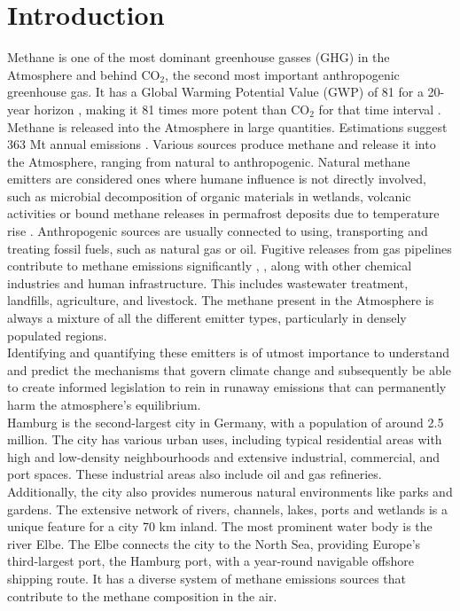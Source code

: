\chapter{Introduction}
\label{chap:intro}

Methane is one of the most dominant greenhouse gasses (GHG) in the Atmosphere and behind CO$_2$, the second most important anthropogenic greenhouse gas. It has a Global Warming Potential Value (GWP) of 81 for a 20-year horizon \cite{Forster.2021}, making it 81 times more potent than CO$_2$ for that time interval \cite{T.Stocker.2013}.\\
Methane is released into the Atmosphere in large quantities. Estimations suggest 363 Mt annual emissions \cite{IEA.4262023}. Various sources produce methane and release it into the Atmosphere, ranging from natural to anthropogenic. Natural methane emitters are considered ones where humane influence is not directly involved, such as microbial decomposition of organic materials in wetlands, volcanic activities or bound methane releases in permafrost deposits due to temperature rise \cite{Fernandez.2022}.  Anthropogenic sources are usually connected to using, transporting and treating fossil fuels, such as natural gas or oil. Fugitive releases from gas pipelines contribute to methane emissions significantly \cite{Schwietzke.2014}, \cite{McKain.2015}, along with other chemical industries and human infrastructure. This includes wastewater treatment, landfills, agriculture, and livestock. The methane present in the Atmosphere is always a mixture of all the different emitter types, particularly in densely populated regions.\\
Identifying and quantifying these emitters is of utmost importance to understand and predict the mechanisms that govern climate change and subsequently be able to create informed legislation to rein in runaway emissions that can permanently harm the atmosphere's equilibrium. \\
Hamburg is the second-largest city in Germany, with a population of around 2.5 million. The city has various urban uses, including typical residential areas with high and low-density neighbourhoods and extensive industrial, commercial, and port spaces. These industrial areas also include oil and gas refineries. Additionally, the city also provides numerous natural environments like parks and gardens. The extensive network of rivers, channels, lakes, ports and wetlands is a unique feature for a city 70 km inland.  The most prominent water body is the river Elbe. The Elbe connects the city to the North Sea, providing Europe's third-largest port, the Hamburg port, with a year-round navigable offshore shipping route. It has a diverse system of methane emissions sources that contribute to the methane composition in the air.\\
